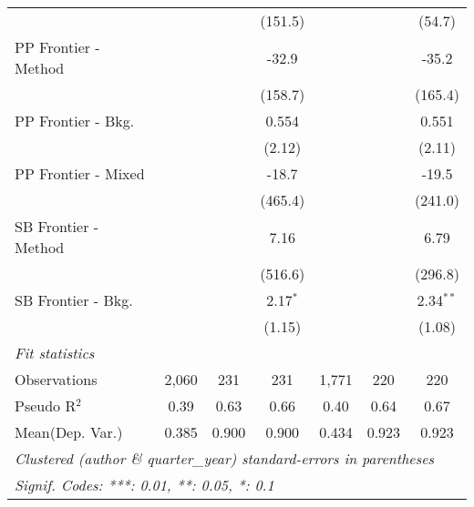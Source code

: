 \begin{tabular}{lcccccc}
                        &         &             & (151.5)     &              &             & (54.7)\\   
   PP Frontier - Method &         &             & -32.9       &              &             & -35.2\\   
                        &         &             & (158.7)     &              &             & (165.4)\\   
   PP Frontier - Bkg.   &         &             & 0.554       &              &             & 0.551\\   
                        &         &             & (2.12)      &              &             & (2.11)\\   
   PP Frontier - Mixed  &         &             & -18.7       &              &             & -19.5\\   
                        &         &             & (465.4)     &              &             & (241.0)\\   
   SB Frontier - Method &         &             & 7.16        &              &             & 6.79\\   
                        &         &             & (516.6)     &              &             & (296.8)\\   
   SB Frontier - Bkg.   &         &             & 2.17$^{*}$  &              &             & 2.34$^{**}$\\   
                        &         &             & (1.15)      &              &             & (1.08)\\   
   \midrule
   \emph{Fit statistics}\\
   Observations         & 2,060   & 231         & 231         & 1,771        & 220         & 220\\  
   Pseudo R$^2$         & 0.39    & 0.63        & 0.66        & 0.40         & 0.64        & 0.67\\  
Mean(Dep. Var.) & 0.385 & 0.900 & 0.900 & 0.434 & 0.923 & 0.923 \\
   \midrule \midrule
   \multicolumn{7}{l}{\emph{Clustered (author \& quarter\_year) standard-errors in parentheses}}\\
   \multicolumn{7}{l}{\emph{Signif. Codes: ***: 0.01, **: 0.05, *: 0.1}}\\
\end{tabular}
\par\endgroup
